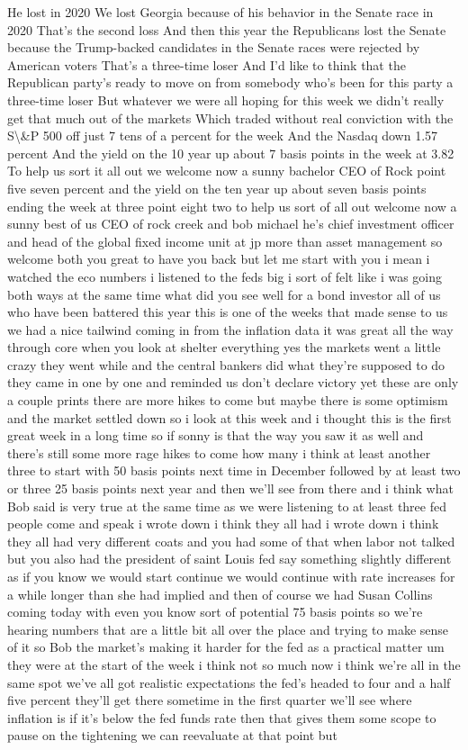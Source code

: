 \documentclass{article}%
\begin{document}
He lost in 2020 We lost Georgia because of his behavior in the Senate race in 2020 That's the second loss And then this year the Republicans lost the Senate because the Trump{-}backed candidates in the Senate races were rejected by American voters That's a three{-}time loser And I'd like to think that the Republican party's ready to move on from somebody who's been for this party a three{-}time loser But whatever we were all hoping for this week we didn't really get that much out of the markets Which traded without real conviction with the S\textbackslash{}\&P 500 off just 7 tens of a percent for the week And the Nasdaq down 1.57 percent And the yield on the 10 year up about 7 basis points in the week at 3.82 To help us sort it all out we welcome now a sunny bachelor CEO of Rock  point five seven percent and the yield on the ten year up about seven basis points ending the week at three point eight two to help us sort of all out welcome now a sunny best of us CEO of rock creek and bob michael he's chief investment officer and head of the global fixed income unit at jp more than asset management so welcome both you great to have you back but let me start with you i mean i watched the eco numbers i listened to the feds big i sort of felt like i was going both ways at the same time what did you see well for a bond investor all of us who have been battered this year this is one of the weeks that made sense to us we had a nice tailwind coming in from the inflation data it was great all the way through core when you look at shelter everything yes the markets went a little crazy they went while and the central bankers did what they're supposed to do they came in one by one and reminded us don't declare victory yet these are only a couple prints there are more hikes to come but maybe there is some optimism and the market settled down so i look at this week and i thought this is the first great week in a long time so if sonny is that the way you saw it as well and there's still some more rage hikes to come how many i think at least another three to start with 50 basis points next time in December followed by at least two or three 25 basis points next year and then we'll see from there and i think what Bob said is very true at the same time as we were listening to at least three fed people come and speak i wrote down i think they all had i wrote down i think they all had very different coats and you had some of that when labor not talked but you also had the president of saint Louis fed say something slightly different as if you know we would start continue we would continue with rate increases for a while longer than she had implied and then of course we had Susan Collins coming today with even you know sort of potential 75 basis points so we're hearing numbers that are a little bit all over the place and trying to make sense of it so Bob the market's making it harder for the fed as a practical matter um they were at the start of the week i think not so much now i think we're all in the same spot we've all got realistic expectations the fed's headed to four and a half five percent they'll get there sometime in the first quarter we'll see where inflation is if it's below the fed funds rate then that gives them some scope to pause on the tightening we can reevaluate at that point but 
\end{document}
